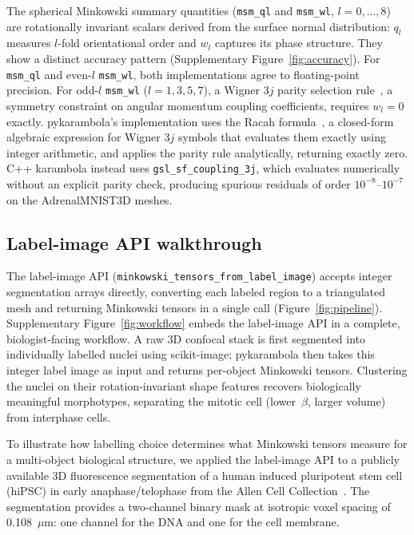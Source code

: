\documentclass[times, twoside, watermark]{zHenriquesLab-StyleBioRxiv}
\newcommand{\newtxt}[1]{#1}
\newcommand{\added}[2][]{#2}        %
\newcommand{\replaced}[3][]{#2}     %
\newcommand{\newtxt}[1]{\textcolor{chgadded}{#1}}
\renewcommand{\added}[2][]{\newtxt{#2}}  %
\begin{document}
The spherical Minkowski summary quantities (\texttt{msm\_ql} and
\texttt{msm\_wl}, $l = 0, \ldots, 8$) are rotationally invariant scalars derived
from the surface normal distribution: $q_l$ measures $l$-fold orientational order
and $w_l$ captures its phase structure.
They show a distinct accuracy pattern (Supplementary Figure~\ref{fig:accuracy}).
For \texttt{msm\_ql} and even-$l$ \texttt{msm\_wl}, both implementations agree
to floating-point precision.
For odd-$l$ \texttt{msm\_wl} ($l = 1, 3, 5, 7$), a Wigner $3j$ parity selection
rule~\cite{Steinhardt1983, Varshalovich1988}, a symmetry constraint on angular
momentum coupling coefficients, requires $w_l = 0$ exactly.
pykarambola's implementation uses the Racah formula~\cite{Varshalovich1988},
a closed-form algebraic expression for Wigner $3j$ symbols that evaluates
them exactly using integer arithmetic, and applies the parity rule
analytically, returning exactly zero.
C++ karambola instead uses \texttt{gsl\_sf\_coupling\_3j}, which
evaluates numerically without an explicit parity check, producing spurious
residuals of order $10^{-8}$--$10^{-7}$ on the AdrenalMNIST3D meshes.


\subsection*{Label-image API walkthrough}
The label-image API (\texttt{minkowski\_tensors\_from\_label\_image}) accepts integer segmentation arrays directly, converting each labeled region to a triangulated mesh and returning Minkowski tensors in a single call (Figure~\ref{fig:pipeline}).
\added{Supplementary Figure~\ref{fig:workflow} embeds the label-image API in a complete, biologist-facing workflow. A raw 3D confocal stack is first segmented into individually labelled nuclei using scikit-image; pykarambola then takes this integer label image as input and returns per-object Minkowski tensors. 
Clustering the nuclei on their rotation-invariant shape features recovers biologically meaningful morphotypes, separating the mitotic cell (lower~$\beta$, larger volume) from interphase cells.}

\replaced{To illustrate how labelling choice determines what Minkowski tensors measure for a multi-object biological structure, we applied the label-image API}{To demonstrate the API, we applied it} to a publicly available 3D fluorescence segmentation of a human induced pluripotent stem cell (hiPSC) in early anaphase/telophase from the Allen Cell Collection~\cite{viana2023integrated}.
The segmentation provides a two-channel binary mask at isotropic voxel spacing of 0.108~$\mu$m: one channel for the DNA and one for the cell membrane.
\end{document}
